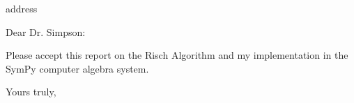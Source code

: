 \documentclass{letter}
\begin{document}
\begin{letter}{address}
\opening{Dear Dr. Simpson:}

Please accept this report on the Risch Algorithm and my implementation
in the Sym\-Py computer algebra system.  

\closing{Yours truly,}
\end{letter}
\end{document}
